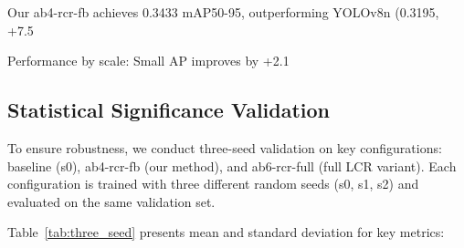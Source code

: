 \documentclass[journal]{IEEEtran}
\begin{document}
Our ab4-rcr-fb achieves 0.3433 mAP50-95, outperforming YOLOv8n (0.3195, +7.5%

Performance by scale: Small AP improves by +2.1%

\subsection{Statistical Significance Validation}

To ensure robustness, we conduct three-seed validation on key configurations: baseline (s0), ab4-rcr-fb (our method), and ab6-rcr-full (full LCR variant). Each configuration is trained with three different random seeds (s0, s1, s2) and evaluated on the same validation set.

Table~\ref{tab:three_seed} presents mean and standard deviation for key metrics:

\begin{table}[t]
\caption{Three-Seed Validation and Statistical Significance Testing}
\label{tab:three_seed}
\centering
\scriptsize
\setlength{\tabcolsep}{2pt}
\end{table}
\end{document}
